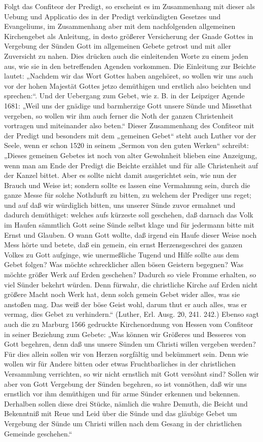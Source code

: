 Folgt das Confiteor der Predigt, so erscheint es im Zusammenhang mit dieser als Uebung und Applicatio des in der Predigt verkündigten Gesetzes und Evangeliums, im Zusammenhang aber mit dem nachfolgenden allgemeinen Kirchengebet als Anleitung, in desto größerer Versicherung der Gnade Gottes in Vergebung der Sünden Gott im allgemeinen
Gebete getrost und mit aller Zuversicht zu nahen. Dies drücken auch die einleitenden Worte zu einem jeden aus, wie sie in den betreffenden Agenden vorkommen. Die Einleitung zur Beichte lautet: „Nachdem wir das Wort Gottes haben angehöret, so wollen wir uns auch vor der hohen Majestät Gottes jetzo demüthigen und erstlich also beichten und sprechen:“. Und der Uebergang zum Gebet, wie z. B. in der Leipziger Agende 1681: „Weil uns der gnädige und barmherzige Gott unsere Sünde und Missethat vergeben, so wollen wir ihm auch ferner die Noth der ganzen Christenheit vortragen und miteinander also beten.“ Dieser Zusammenhang des Confiteor mit der Predigt und besonders mit dem „gemeinen Gebet“ steht auch Luther vor der Seele, wenn er schon 1520 in seinem „Sermon von den guten Werken“ schreibt: „Dieses gemeinen Gebetes ist noch von alter Gewohnheit blieben eine Anzeigung, wenn man am Ende der Predigt die Beichte erzählet und für alle Christenheit auf der Kanzel bittet. Aber es sollte nicht damit ausgerichtet sein, wie nun der Brauch und Weise ist; sondern sollte es lassen eine Vermahnung sein, durch die ganze Messe für solche Nothdurft zu bitten, zu welchem der Prediger uns reget; und auf daß wir würdiglich bitten, uns unserer Sünde zuvor ermahnet und dadurch demüthiget: welches aufs kürzeste soll geschehen, daß darnach das Volk im Haufen sämmtlich Gott seine Sünde selbst klage und für jedermann bitte mit Ernst und Glauben. O wann Gott wollte, daß irgend ein Haufe dieser Weise noch Mess hörte und betete, daß ein gemein, ein ernst Herzensgeschrei des ganzen Volkes zu Gott aufginge, wie unermeßliche Tugend und Hilfe sollte aus dem Gebet folgen? Was möchte schrecklicher allen bösen Geistern begegnen? Was möchte größer Werk auf Erden geschehen? Dadurch so viele Fromme erhalten, so viel Sünder bekehrt würden. Denn fürwahr, die christliche Kirche auf Erden nicht größere Macht noch Werk hat, denn solch gemein Gebet wider alles, was sie anstoßen mag. Das weiß der böse Geist wohl, darum thut er auch alles, was er vermag, dies Gebet zu verhindern.“ (Luther, Erl. Ausg. 20, 241. 242.) Ebenso sagt auch die zu Marburg 1566 gedruckte Kirchenordnung von Hessen vom Confiteor in seiner Beziehung zum Gebete: „Was können wir Größeres und Besseres von Gott begehren, denn daß uns unsere Sünden um Christi willen vergeben werden? Für dies allein sollen wir von Herzen sorgfältig und bekümmert sein. Denn wie wollen wir für Andere bitten oder etwas Fruchtbarliches in der christlichen Versammlung verrichten, so wir nicht ernstlich mit Gott versöhnt sind? Sollen wir aber von Gott
Vergebung der Sünden begehren, so ist vonnöthen, daß wir uns ernstlich vor ihm demüthigen und für arme Sünder erkennen und bekennen. Derhalben sollen diese drei Stücke, nämlich die wahre Demuth, die Beicht und Bekenntniß mit Reue und Leid über die Sünde und das gläubige Gebet um Vergebung der Sünde um Christi willen nach dem Gesang in der christlichen Gemeinde geschehen.“


